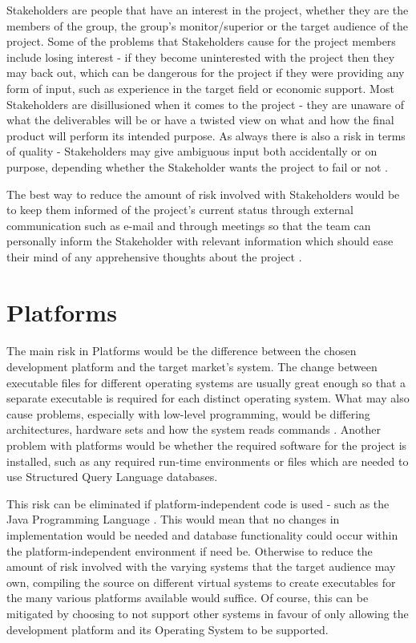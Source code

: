 Stakeholders are people that have an interest in the project, whether they are
the members of the group, the group's monitor/superior or the target audience of
the project.  Some of the problems that Stakeholders cause for the project
members include losing interest - if they become uninterested with the project
then they may back out, which can be dangerous for the project if they were
providing any form of input, such as experience in the target field or economic
support.  Most Stakeholders are disillusioned when it comes to the project - 
they are unaware of what the deliverables will be or have a twisted view on what
and how the final product will perform its intended purpose.  As always there is
also a risk in terms of quality - Stakeholders may give ambiguous input both
accidentally or on purpose, depending whether the Stakeholder wants the project
to fail or not \cite{RiskList}.

The best way to reduce the amount of risk involved with Stakeholders would be to
keep them informed of the project's current status through external
communication such as e-mail and through meetings so that the team can
personally inform the Stakeholder with relevant information which should ease
their mind of any apprehensive thoughts about the project \cite{stakeInfo}.

\section{Platforms}
\paragraph{}

The main risk in Platforms would be the difference between the chosen
development platform and the target market's system.  The change between
executable files for different operating systems are usually great enough so
that a separate executable is required for each distinct operating system.
What may also cause problems, especially with low-level programming, would be
differing architectures, hardware sets and how the system reads commands
\cite{wikiArchDiff}.
Another problem with platforms would be whether the required software for the
project is installed, such as any required run-time environments or files
which are needed to use Structured Query Language databases.

This risk can be eliminated if platform-independent code is used - such as the
Java Programming Language \cite{javaFeatures}.  This would mean that no changes
in implementation would be needed and database functionality could occur within
the platform-independent environment if need be.  Otherwise to reduce the amount
of risk involved with the varying systems that the target audience may own,
compiling the source on different virtual systems to create executables for the
many various platforms available would suffice.  Of course, this can be
mitigated by choosing to not support other systems in favour of only allowing
the development platform and its Operating System to be supported.

